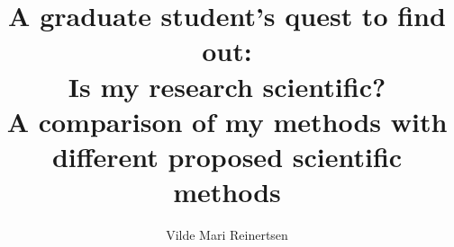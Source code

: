 \documentclass[a4paper,12pt]{article}
\date{}
\author{Vilde Mari Reinertsen}
\title{\LARGE {\fontfamily{phv}\selectfont A graduate student's quest to find out: \\Is my research scientific?\\ \vspace{0.7cm} \large A comparison of my methods with different proposed scientific methods} \\}
\begin{document}
\begingroup
\let\center\flushleft
\let\endcenter\endflushleft
\maketitle
\endgroup



\newpage

\end{document}

